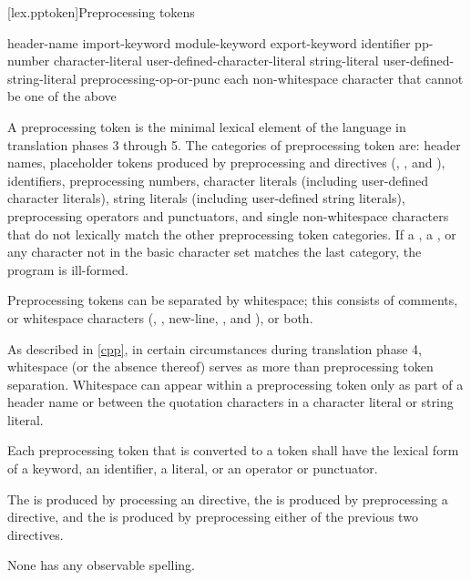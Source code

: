 [lex.pptoken]{Preprocessing tokens}

%
\begin{bnf}
\br
    header-name\br
    import-keyword\br
    module-keyword\br
    export-keyword\br
    identifier\br
    pp-number\br
    character-literal\br
    user-defined-character-literal\br
    string-literal\br
    user-defined-string-literal\br
    preprocessing-op-or-punc\br
    \textnormal{each non-whitespace character that cannot be one of the above}
\end{bnf}

\pnum
A preprocessing token is the minimal lexical element of the language in translation
phases 3 through 5.
The categories of preprocessing token are: header names,
placeholder tokens produced by preprocessing  and  directives
(, , and ),
identifiers, preprocessing numbers, character literals (including user-defined character
literals), string literals (including user-defined string literals), preprocessing
operators and punctuators, and single non-whitespace characters that do not lexically
match the other preprocessing token categories.
If a , a ,
or any character not in the basic character set
matches the last category, the program is ill-formed.

\pnum
Preprocessing tokens can be separated by
%
whitespace;
%
this consists of comments, or whitespace characters
(,
,
new-line,
, and
), or both.
\begin{note}
As described in \ref{cpp}, in certain
circumstances during translation phase 4, whitespace (or the absence
thereof) serves as more than preprocessing token separation. Whitespace
can appear within a preprocessing token only as part of a header name or
between the quotation characters in a character literal or
string literal.
\end{note}

\pnum
Each preprocessing token that is converted to a token
shall have the lexical form of a keyword, an identifier, a literal,
or an operator or punctuator.

\pnum
{}%
%
%
The  is produced
by processing an  directive,
the  is produced
by preprocessing a  directive, and
the  is produced
by preprocessing either of the previous two directives.
\begin{note}
None has any observable spelling.
\end{note}

